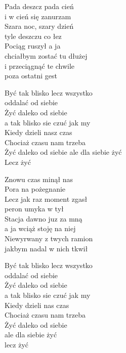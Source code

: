 \begin{text}
    Pada deszcz pada cień\\
    i w cień się zanurzam\\
    Szara noc, szary dzień\\
    tyle deszczu co łez\\
    Pociąg ruszył a ja\\
    chciałbym zostać tu dłużej\\
    i przeciągnąć te chwile\\
    poza ostatni gest

    Być tak blisko lecz wszystko\\
    oddalać od siebie\\
    Żyć daleko od siebie\\
    a tak blisko sie czuć jak my\\
    Kiedy dzieli nasz czas\\
    Chociaż czasu nam trzeba\\
    Żyć daleko od siebie ale dla siebie żyć\\
    Lecz żyć

    Znowu czas minął nas\\
    Pora na pożegnanie\\
    Lecz jak raz moment zgasł\\
    peron umyka w tył\\
    Stacja dawno juz za mną\\
    a ja wciąż stoję na niej\\
    Niewyrwany z twych ramion\\
    jakbym nadal w nich tkwił

    Być tak blisko lecz wszystko\\
    oddalać od siebie\\
    Żyć daleko od siebie\\
    a tak blisko sie czuć jak my\\
    Kiedy dzieli nas czas\\
    Chociaż czasu nam trzeba\\
    Żyć daleko od siebie\\
    ale dla siebie żyć\\
    lecz żyć
\end{text}
\begin{chord}

\end{chord}